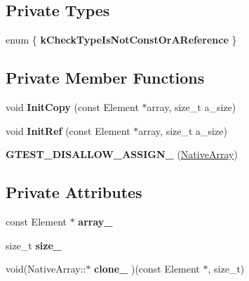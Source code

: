 \subsection*{Private Types}
\begin{DoxyCompactItemize}
\item 
\mbox{\label{classtesting_1_1internal_1_1_native_array_a7f2e0631dbc7f71879816c830cb6ca52}} 
enum \{ {\bfseries k\+Check\+Type\+Is\+Not\+Const\+Or\+A\+Reference}
 \}
\end{DoxyCompactItemize}
\subsection*{Private Member Functions}
\begin{DoxyCompactItemize}
\item 
\mbox{\label{classtesting_1_1internal_1_1_native_array_a8c0069cc09f559785fe4923fc118056f}} 
void {\bfseries Init\+Copy} (const Element $\ast$array, size\+\_\+t a\+\_\+size)
\item 
\mbox{\label{classtesting_1_1internal_1_1_native_array_ac6ad6d79e17e2c98a9d4d684afcb7f79}} 
void {\bfseries Init\+Ref} (const Element $\ast$array, size\+\_\+t a\+\_\+size)
\item 
\mbox{\label{classtesting_1_1internal_1_1_native_array_a6633f3eab6947d4502fb1c69f95be66e}} 
{\bfseries G\+T\+E\+S\+T\+\_\+\+D\+I\+S\+A\+L\+L\+O\+W\+\_\+\+A\+S\+S\+I\+G\+N\+\_\+} (\hyperlink{classtesting_1_1internal_1_1_native_array}{Native\+Array})
\end{DoxyCompactItemize}
\subsection*{Private Attributes}
\begin{DoxyCompactItemize}
\item 
\mbox{\label{classtesting_1_1internal_1_1_native_array_adadc025fbbbd43904d4036991019f18f}} 
const Element $\ast$ {\bfseries array\+\_\+}
\item 
\mbox{\label{classtesting_1_1internal_1_1_native_array_aa7e4251de39aaa75f697f0eaeedbf06e}} 
size\+\_\+t {\bfseries size\+\_\+}
\item 
\mbox{\label{classtesting_1_1internal_1_1_native_array_addd7442a10398a60215a9989bcbd8078}} 
void(Native\+Array\+::$\ast$ {\bfseries clone\+\_\+} )(const Element $\ast$, size\+\_\+t)
\end{DoxyCompactItemize}


